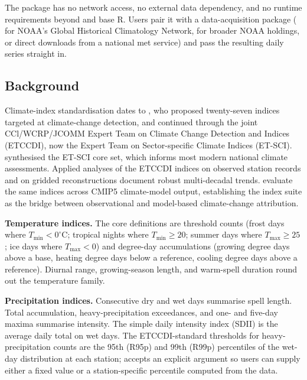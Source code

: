 The package has no network access, no external data dependency, and no
runtime requirements beyond  and base R. Users pair it with
a data-acquisition package ( for NOAA's Global
Historical Climatology Network,  for broader NOAA
holdings, or direct downloads from a national met service) and pass the
resulting daily series straight in.

\subsection{Background}\label{background}

Climate-index standardisation dates to \citet{frich2002observed}, who
proposed twenty-seven indices targeted at climate-change detection, and
continued through the joint CCl/WCRP/JCOMM Expert Team on Climate Change
Detection and Indices (ETCCDI), now the Expert Team on Sector-specific
Climate Indices (ET-SCI). \citet{zhang2011indices} synthesised the
ET-SCI core set, which informs most modern national climate assessments.
Applied analyses of the ETCCDI indices on observed station records
\citep{alexander2006global} and on gridded reconstructions
\citep{donat2013hadex2} document robust multi-decadal trends.
\citet{sillmann2013indices} evaluate the same indices across CMIP5
climate-model output, establishing the index suite as the bridge between
observational and model-based climate-change attribution.

\textbf{Temperature indices.} The core definitions are threshold counts
(frost days where \(T_{\min} < 0^\circ\)C; tropical nights where
\(T_{\min} \geq 20\); summer days where \(T_{\max} \geq 25\); ice days
where \(T_{\max} < 0\)) and degree-day accumulations (growing degree
days above a base, heating degree days below a reference, cooling degree
days above a reference). Diurnal range, growing-season length, and
warm-spell duration round out the temperature family.

\textbf{Precipitation indices.} Consecutive dry and wet days summarise
spell length. Total accumulation, heavy-precipitation exceedances, and
one- and five-day maxima summarise intensity. The simple daily intensity
index (SDII) is the average daily total on wet days. The ETCCDI-standard
thresholds for heavy-precipitation counts are the 95th (R95p) and 99th
(R99p) percentiles of the wet-day distribution at each station;
 accepts an explicit  argument
so users can supply either a fixed value or a station-specific
percentile computed from the data.

